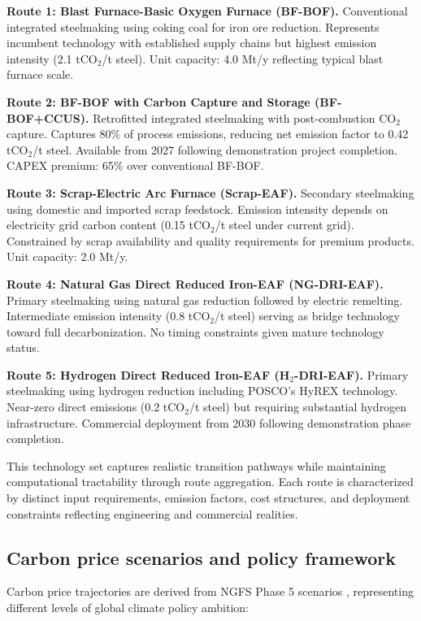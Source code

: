 \documentclass[preprint,1p,authoryear]{elsarticle}
\begin{document}
\textbf{Route 1: Blast Furnace-Basic Oxygen Furnace (BF-BOF).} Conventional integrated steelmaking using coking coal for iron ore reduction. Represents incumbent technology with established supply chains but highest emission intensity (2.1 tCO$_2$/t steel). Unit capacity: 4.0 Mt/y reflecting typical blast furnace scale.

\textbf{Route 2: BF-BOF with Carbon Capture and Storage (BF-BOF+CCUS).} Retrofitted integrated steelmaking with post-combustion CO$_2$ capture. Captures 80\% of process emissions, reducing net emission factor to 0.42 tCO$_2$/t steel. Available from 2027 following demonstration project completion. CAPEX premium: 65\% over conventional BF-BOF.

\textbf{Route 3: Scrap-Electric Arc Furnace (Scrap-EAF).} Secondary steelmaking using domestic and imported scrap feedstock. Emission intensity depends on electricity grid carbon content (0.15 tCO$_2$/t steel under current grid). Constrained by scrap availability and quality requirements for premium products. Unit capacity: 2.0 Mt/y.

\textbf{Route 4: Natural Gas Direct Reduced Iron-EAF (NG-DRI-EAF).} Primary steelmaking using natural gas reduction followed by electric remelting. Intermediate emission intensity (0.8 tCO$_2$/t steel) serving as bridge technology toward full decarbonization. No timing constraints given mature technology status.

\textbf{Route 5: Hydrogen Direct Reduced Iron-EAF (H$_2$-DRI-EAF).} Primary steelmaking using hydrogen reduction including POSCO's HyREX technology. Near-zero direct emissions (0.2 tCO$_2$/t steel) but requiring substantial hydrogen infrastructure. Commercial deployment from 2030 following demonstration phase completion.

This technology set captures realistic transition pathways while maintaining computational tractability through route aggregation. Each route is characterized by distinct input requirements, emission factors, cost structures, and deployment constraints reflecting engineering and commercial realities.

\subsection{Carbon price scenarios and policy framework}

Carbon price trajectories are derived from NGFS Phase 5 scenarios \citep{NGFS2024}, representing different levels of global climate policy ambition:
\end{document}
